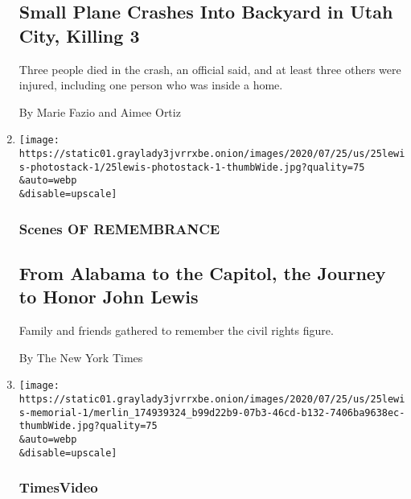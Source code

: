 \begin{enumerate}
  \hypertarget{small-plane-crashes-into-backyard-in-utah-city-killing-3}{%
  \subsection{Small Plane Crashes Into Backyard in Utah City, Killing
  3}\label{small-plane-crashes-into-backyard-in-utah-city-killing-3}}

  Three people died in the crash, an official said, and at least three
  others were injured, including one person who was inside a home.

  By Marie Fazio and Aimee Ortiz
\item
  \href{/2020/07/25/us/photos-john-lewis-memorial.html}{}

  \texttt{[image: https://static01.graylady3jvrrxbe.onion/images/2020/07/25/us/25lewis-photostack-1/25lewis-photostack-1-thumbWide.jpg?quality=75\\\&auto=webp\\\&disable=upscale]}

  \hypertarget{scenes-of-remembrance}{%
  \subsubsection{Scenes OF REMEMBRANCE}\label{scenes-of-remembrance}}

  \hypertarget{from-alabama-to-the-capitol-the-journey-to-honor-john-lewis}{%
  \subsection{From Alabama to the Capitol, the Journey to Honor John
  Lewis}\label{from-alabama-to-the-capitol-the-journey-to-honor-john-lewis}}

  Family and friends gathered to remember the civil rights figure.

  By The New York Times
\item
  \href{/video/us/politics/100000007256826/john-lewis-memorial-troy-alabama.html}{}

  \texttt{[image: https://static01.graylady3jvrrxbe.onion/images/2020/07/25/us/25lewis-memorial-1/merlin\_174939324\_b99d22b9-07b3-46cd-b132-7406ba9638ec-thumbWide.jpg?quality=75\\\&auto=webp\\\&disable=upscale]}

  \hypertarget{timesvideo-1}{%
  \subsubsection{TimesVideo}\label{timesvideo-1}}

  \hypertarget{family-members-remember-john-lewis-in-his-hometown}{%
}
\end{enumerate}
